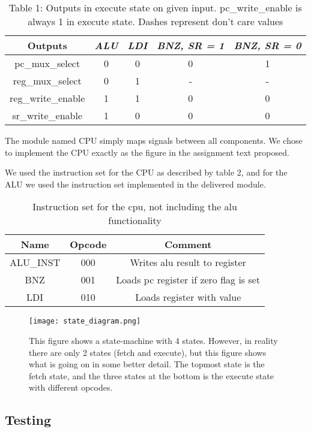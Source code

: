 \documentclass[11pt]{report}
\begin{document}
\begin{table}[h]
  \centering
  \begin{tabular}{|c|c|c|c|c|} \hline
    Outputs&\emph{ALU}&\emph{LDI}&\emph{BNZ, SR = 1}&\emph{BNZ, SR = 0}\\ \hline
    pc\_mux\_select&0&0&0&1  \\
    reg\_mux\_select&0&1&-&-  \\
    reg\_write\_enable&1&1&0&0  \\
    sr\_write\_enable&1&0&0&0  \\
    \hline
  \end{tabular}
  \caption{Table 1: Outputs in execute state on given input.
  pc\_write\_enable is always 1 in execute state. Dashes represent don't care values}
\end{table}

The module named CPU simply maps signals between all components.  
We chose to implement the CPU exactly as the figure in the assignment text proposed.

We used the instruction set for the CPU as described by table 2, and for the ALU we
used the instruction set implemented in the delivered module.

\begin{table}[h]
  \centering
  \begin{tabular}{|c|c|c|}
    \hline
    Name&Opcode&Comment \\
    \hline
    ALU\_INST&000&Writes alu result to register\\
    BNZ&001&Loads pc register if zero flag is set\\
    LDI&010&Loads register with value\\
    \hline
  \end{tabular}
  \caption{Instruction set for the cpu, not including the alu functionality}
\end{table}

\begin{figure}
\centering
\texttt{[image: state\_diagram.png]} \\
\caption{This figure shows a state-machine with 4 states. However, in reality there 
are only 2 states (fetch and execute), but this figure shows what is going on in some 
better detail. The topmost state is the fetch state, and the three states at the 
bottom is the execute state with different opcodes.}
\end{figure}

\subsection*{Testing}
\end{document}
